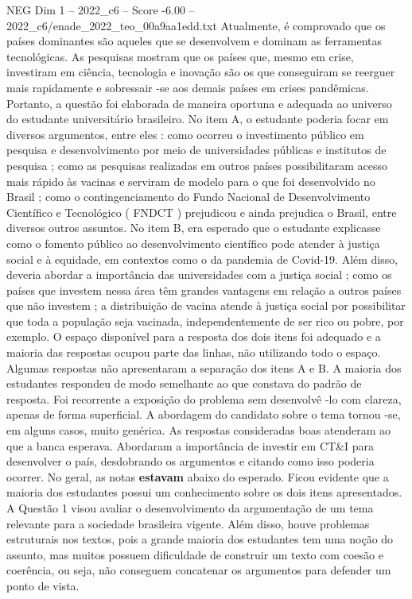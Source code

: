 \begin{textsample}{NEG Dim 1 – 2022\_c6 – Score -6.00 – 2022\_c6/enade\_2022\_teo\_00a9aa1edd.txt}
Atualmente, é comprovado que os países dominantes são aqueles que se desenvolvem e dominam as ferramentas tecnológicas.
As pesquisas mostram que os países que, mesmo em crise, investiram em ciência, tecnologia e inovação são os que conseguiram se reerguer mais rapidamente e sobressair -se aos demais países em crises pandêmicas.
Portanto, a questão foi elaborada de maneira oportuna e adequada ao universo do estudante universitário brasileiro.
No item A, o estudante poderia focar em diversos argumentos, entre eles : como ocorreu o investimento público em pesquisa e desenvolvimento por meio de universidades públicas e institutos de pesquisa ; como as pesquisas realizadas em outros países possibilitaram acesso mais rápido às vacinas e serviram de modelo para o que foi desenvolvido no Brasil ; como o contingenciamento do Fundo Nacional de Desenvolvimento Científico e Tecnológico ( FNDCT ) prejudicou e ainda prejudica o Brasil, entre diversos outros assuntos.
No item B, era esperado que o estudante explicasse como o fomento público ao desenvolvimento científico pode atender à justiça social e à equidade, em contextos como o da pandemia de Covid-19.
Além disso, deveria abordar a importância das universidades com a justiça social ; como os países que investem nessa área têm grandes vantagens em relação a outros países que não investem ; a distribuição de vacina atende à justiça social por possibilitar que toda a população seja vacinada, independentemente de ser rico ou pobre, por exemplo.
O espaço disponível para a resposta dos dois itens foi adequado e a maioria das respostas ocupou parte das linhas, não utilizando todo o espaço.
Algumas respostas não apresentaram a separação dos itens A e B.
A maioria dos estudantes respondeu de modo semelhante ao que constava do padrão de resposta.
Foi recorrente a exposição do problema sem desenvolvê -lo com clareza, apenas de forma superficial.
A abordagem do candidato sobre o tema tornou -se, em alguns casos, muito genérica.
As respostas consideradas boas atenderam ao que a banca esperava.
Abordaram a importância de investir em CT\&I para desenvolver o país, desdobrando os argumentos e citando como isso poderia ocorrer.
No geral, as notas \textbf{estavam} abaixo do esperado.
Ficou evidente que a maioria dos estudantes possui um conhecimento sobre os dois itens apresentados.
A Questão 1 visou avaliar o desenvolvimento da argumentação de um tema relevante para a sociedade brasileira vigente.
Além disso, houve problemas estruturais nos textos, pois a grande maioria dos estudantes tem uma noção do assunto, mas muitos possuem dificuldade de construir um texto com coesão e coerência, ou seja, não conseguem concatenar os argumentos para defender um ponto de vista.

\end{textsample}
